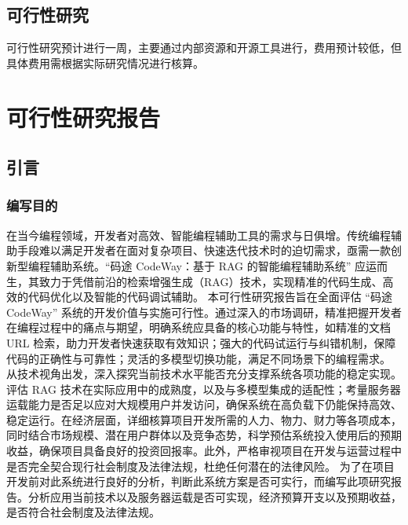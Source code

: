 \documentclass[
    report,     %
    oneside,    %
    UTF8,       %
    zihao=-4    %
]{config} %
\begin{document}
\section{可行性研究}
可行性研究预计进行一周，主要通过内部资源和开源工具进行，费用预计较低，但具体费用需根据实际研究情况进行核算。


\chapter{可行性研究报告}
\section{引言}
\subsection{编写目的}
在当今编程领域，开发者对高效、智能编程辅助工具的需求与日俱增。传统编程辅助手段难以满足开发者在面对复杂项目、快速迭代技术时的迫切需求，亟需一款创新型编程辅助系统。“码途 CodeWay：基于 RAG 的智能编程辅助系统” 应运而生，其致力于凭借前沿的检索增强生成（RAG）技术，实现精准的代码生成、高效的代码优化以及智能的代码调试辅助。
本可行性研究报告旨在全面评估 “码途 CodeWay” 系统的开发价值与实施可行性。通过深入的市场调研，精准把握开发者在编程过程中的痛点与期望，明确系统应具备的核心功能与特性，如精准的文档 URL 检索，助力开发者快速获取有效知识；强大的代码试运行与纠错机制，保障代码的正确性与可靠性；灵活的多模型切换功能，满足不同场景下的编程需求。
从技术视角出发，深入探究当前技术水平能否充分支撑系统各项功能的稳定实现。评估 RAG 技术在实际应用中的成熟度，以及与多模型集成的适配性；考量服务器运载能力是否足以应对大规模用户并发访问，确保系统在高负载下仍能保持高效、稳定运行。在经济层面，详细核算项目开发所需的人力、物力、财力等各项成本，同时结合市场规模、潜在用户群体以及竞争态势，科学预估系统投入使用后的预期收益，确保项目具备良好的投资回报率。此外，严格审视项目在开发与运营过程中是否完全契合现行社会制度及法律法规，杜绝任何潜在的法律风险。
为了在项目开发前对此系统进行良好的分析，判断此系统方案是否可实行，而编写此项研究报告。分析应用当前技术以及服务器运载是否可实现，经济预算开支以及预期收益，是否符合社会制度及法律法规。
\end{document}
